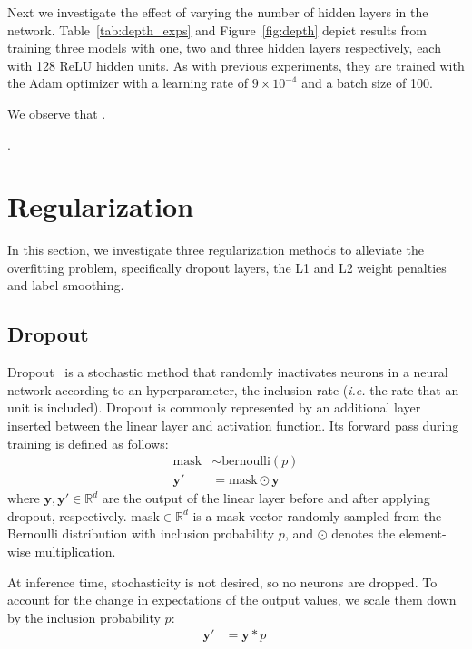 \documentclass{article}
\begin{document}
\questionTableTwo
\questionFigureThree

Next we investigate the effect of varying the number of hidden layers in the network. 
Table~\ref{tab:depth_exps} and Figure~\ref{fig:depth} depict results from training three models with one, two and three hidden layers respectively, each with 128 ReLU hidden units. 
As with previous experiments, they are trained with the Adam optimizer with a learning rate of $9 \times 10^{-4}$ and a batch size of 100. 

We observe that \questionFour.

\questionFive.




\section{Regularization}
\label{sec:task2.1} 

In this section, we investigate three regularization methods to alleviate the overfitting problem, specifically dropout layers, the L1 and L2 weight penalties and label smoothing.


\subsection{Dropout}

Dropout~\cite{srivastava2014dropout} is a stochastic method that randomly inactivates neurons in a neural network according to an hyperparameter, the inclusion rate  (\textit{i.e.} the rate that an unit is included).
Dropout is commonly represented by an additional layer inserted between the linear layer and activation function.
Its forward pass during training is defined as follows:
\begin{align}
    \text{mask} &\sim \text{bernoulli}(p)\\
    \bm{y}' &= \text{mask} \odot \bm{y}\
\end{align}
where $\bm{y}, \bm{y}' \in \mathbb{R}^d$ are the output of the linear layer before and after applying dropout, respectively. 
$\text{mask} \in \mathbb{R}^d$ is a mask vector randomly sampled from the Bernoulli distribution with inclusion probability $p$, and $\odot$ denotes the element-wise multiplication.

At inference time, stochasticity is not desired, so no neurons are dropped. 
To account for the change in expectations of the output values, we scale them down by the inclusion probability $p$:
\begin{align}
    \bm{y}' &= \bm{y}*p\
\end{align}
\end{document}
